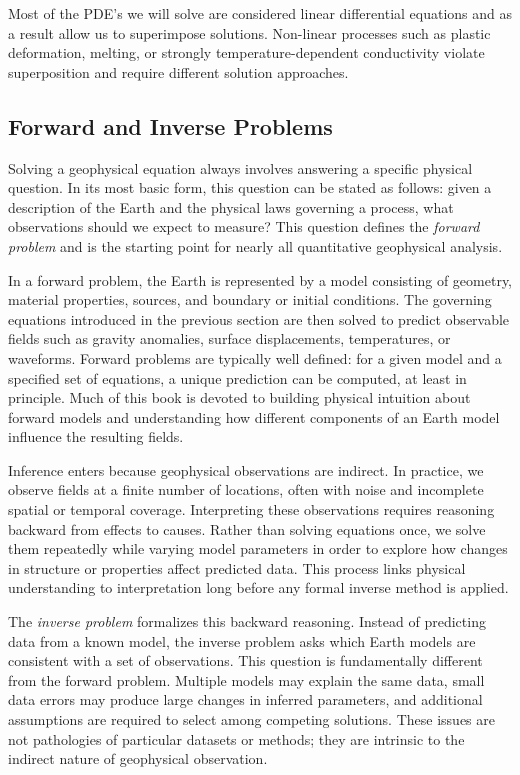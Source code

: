 Most of the PDE's we will solve are considered linear differential equations and as a result allow us to superimpose solutions. Non-linear processes such as plastic deformation, melting, or strongly temperature-dependent conductivity violate superposition and require different solution approaches.

\subsection{Forward and Inverse Problems}

Solving a geophysical equation always involves answering a specific physical question. In its most basic form, this question can be stated as follows: given a description of the Earth and the physical laws governing a process, what observations should we expect to measure? This question defines the \emph{forward problem} and is the starting point for nearly all quantitative geophysical analysis.

In a forward problem, the Earth is represented by a model consisting of geometry, material properties, sources, and boundary or initial conditions. The governing equations introduced in the previous section are then solved to predict observable fields such as gravity anomalies, surface displacements, temperatures, or waveforms. Forward problems are typically well defined: for a given model and a specified set of equations, a unique prediction can be computed, at least in principle. Much of this book is devoted to building physical intuition about forward models and understanding how different components of an Earth model influence the resulting fields.

Inference enters because geophysical observations are indirect. In practice, we observe fields at a finite number of locations, often with noise and incomplete spatial or temporal coverage. Interpreting these observations requires reasoning backward from effects to causes. Rather than solving equations once, we solve them repeatedly while varying model parameters in order to explore how changes in structure or properties affect predicted data. This process links physical understanding to interpretation long before any formal inverse method is applied.

The \emph{inverse problem} formalizes this backward reasoning. Instead of predicting data from a known model, the inverse problem asks which Earth models are consistent with a set of observations. This question is fundamentally different from the forward problem. Multiple models may explain the same data, small data errors may produce large changes in inferred parameters, and additional assumptions are required to select among competing solutions. These issues are not pathologies of particular datasets or methods; they are intrinsic to the indirect nature of geophysical observation.

